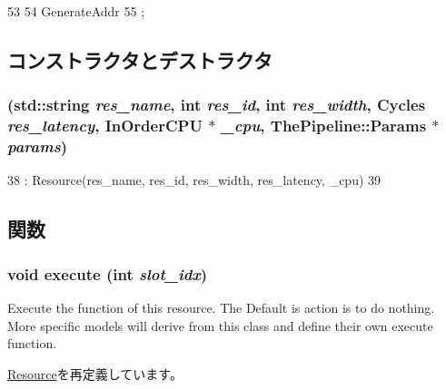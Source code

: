 \begin{DoxyCode}
53                  {
54         GenerateAddr
55     };
\end{DoxyCode}


\subsection{コンストラクタとデストラクタ}
\hypertarget{classAGENUnit_ad1527407cd4794ebff63afeb1e801999}{
\subsubsection[{AGENUnit}]{ (std::string {\em res\_\-name}, \/  int {\em res\_\-id}, \/  int {\em res\_\-width}, \/  {\bf Cycles} {\em res\_\-latency}, \/  {\bf InOrderCPU} $\ast$ {\em \_\-cpu}, \/  {\bf ThePipeline::Params} $\ast$ {\em params})}}
\label{classAGENUnit_ad1527407cd4794ebff63afeb1e801999}



\begin{DoxyCode}
38     : Resource(res_name, res_id, res_width, res_latency, _cpu)
39 { }
\end{DoxyCode}


\subsection{関数}
\hypertarget{classAGENUnit_a7b7fff82f8c9cbdb02add1346f60bb9e}{
\subsubsection[{execute}]{\setlength{\rightskip}{0pt plus 5cm}void execute (int {\em slot\_\-idx})}}
\label{classAGENUnit_a7b7fff82f8c9cbdb02add1346f60bb9e}
Execute the function of this resource. The Default is action is to do nothing. More specific models will derive from this class and define their own execute function. 

\hyperlink{classResource_a39af49c5568d1db3f53c12d7d6914c32}{Resource}を再定義しています。


